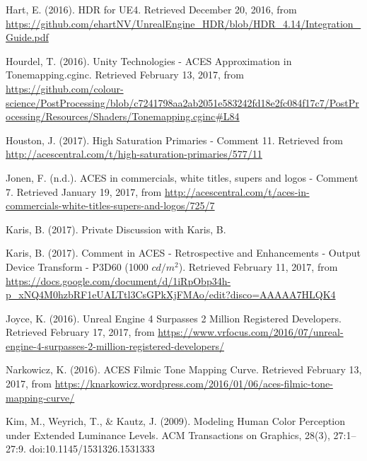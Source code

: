 \documentclass[conference]{IEEEtran}
\begin{document}
\begin{thebibliography}{1}
\renewcommand\@biblabel[1]{[Har16]}
\bibitem{}
Hart, E. (2016). HDR for UE4. Retrieved December 20, 2016, from \url{https://github.com/ehartNV/UnrealEngine_HDR/blob/HDR_4.14/Integration_Guide.pdf} \vspace{2mm}

\renewcommand\@biblabel[1]{[Hou16]}
\bibitem{}
Hourdel, T. (2016). Unity Technologies - ACES Approximation in Tonemapping.cginc. Retrieved February 13, 2017, from \url{https://github.com/colour-science/PostProcessing/blob/c7241798aa2ab2051e583242fd18e2fc084f17c7/PostProcessing/Resources/Shaders/Tonemapping.cginc#L84} \vspace{2mm}

\renewcommand\@biblabel[1]{[Hou17]}
\bibitem{}
Houston, J. (2017). High Saturation Primaries - Comment 11. Retrieved from \url{http://acescentral.com/t/high-saturation-primaries/577/11} \vspace{2mm}

\renewcommand\@biblabel[1]{[Jon17]}
\bibitem{}
Jonen, F. (n.d.). ACES in commercials, white titles, supers and logos - Comment 7. Retrieved January 19, 2017, from \url{http://acescentral.com/t/aces-in-commercials-white-titles-supers-and-logos/725/7} \vspace{2mm}

\renewcommand\@biblabel[1]{[KaA17]}
\bibitem{}
Karis, B. (2017). Private Discussion with Karis, B. \vspace{2mm}

\renewcommand\@biblabel[1]{[KaB17]}
\bibitem{}
Karis, B. (2017). Comment in ACES - Retrospective and Enhancements - Output Device Transform - P3D60 (1000 $cd/m^2$). Retrieved February 11, 2017, from \url{https://docs.google.com/document/d/1iRpObp34h-p_xNQ4M0hzbRF1eUALTtl3CsGPkXjFMAo/edit?disco=AAAAA7HLQK4} \vspace{2mm}

\renewcommand\@biblabel[1]{[Kev16]}
\bibitem{}
Joyce, K. (2016). Unreal Engine 4 Surpasses 2 Million Registered Developers. Retrieved February 17, 2017, from \url{https://www.vrfocus.com/2016/07/unreal-engine-4-surpasses-2-million-registered-developers/} \vspace{2mm}

\renewcommand\@biblabel[1]{[Nar16]}
\bibitem{}
Narkowicz, K. (2016). ACES Filmic Tone Mapping Curve. Retrieved February 13, 2017, from \url{https://knarkowicz.wordpress.com/2016/01/06/aces-filmic-tone-mapping-curve/} \vspace{2mm}

\renewcommand\@biblabel[1]{[KWK09]}
\bibitem{}
Kim, M., Weyrich, T., \& Kautz, J. (2009). Modeling Human Color Perception under Extended Luminance Levels. ACM Transactions on Graphics, 28(3), 27:1--27:9. doi:10.1145/1531326.1531333 \vspace{2mm}


\end{thebibliography}
\end{document}
